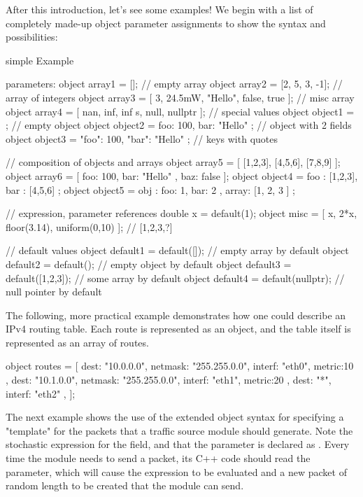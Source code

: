 After this introduction, let's see some examples! We begin with a list of
completely made-up object parameter assignments to show the syntax and
possibilities:

\begin{ned}
simple Example {
    parameters:
        object array1 = []; // empty array
        object array2 = [2, 5, 3, -1]; // array of integers
        object array3 = [ 3, 24.5mW, "Hello", false, true ]; // misc array
        object array4 = [ nan, inf, inf s, null, nullptr ]; // special values
        object object1 = {};  // empty object
        object object2 = { foo: 100, bar: "Hello" }; // object with 2 fields
        object object3 = { "foo": 100, "bar": "Hello" }; // keys with quotes

        // composition of objects and arrays
        object array5 = [ [1,2,3], [4,5,6], [7,8,9] ];
        object array6 = [ { foo: 100, bar: "Hello" }, { baz: false } ];
        object object4 = { foo : [1,2,3], bar : [4,5,6] };
        object object5 = { obj : { foo: 1, bar: 2 }, array: [1, 2, 3 ] };

        // expression, parameter references
        double x = default(1);
        object misc = [ x, 2*x, floor(3.14), uniform(0,10) ]; // [1,2,3,?]

        // default values
        object default1 = default([]); // empty array by default
        object default2 = default({}); // empty object by default
        object default3 = default([1,2,3]); // some array by default
        object default4 = default(nullptr); // null pointer by default
}
\end{ned}

The following, more practical example demonstrates how one could describe an
IPv4 routing table. Each route is represented as an object, and the table itself
is represented as an array of routes.

\begin{ned}
object routes = [
    { dest: "10.0.0.0", netmask: "255.255.0.0", interf: "eth0", metric:10 },
    { dest: "10.1.0.0", netmask: "255.255.0.0", interf: "eth1", metric:20 },
    { dest: "*", interf: "eth2" },
];
\end{ned}

The next example shows the use of the extended object syntax for specifying a
"template" for the packets that a traffic source module should generate. Note
the stochastic expression for the  field, and that the parameter
is declared as . Every time the module needs to send a
packet, its C++ code should read the  parameter, which will
cause the expression to be evaluated and a new packet of random length to be
created that the module can send.

